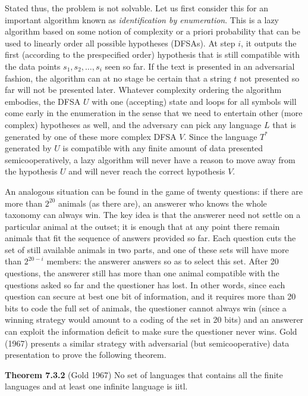 Stated thus, the problem is not solvable. Let us first consider this for an
important algorithm known as {\it identification by enumeration}. This is a
lazy algorithm based on some notion of complexity or a priori probability that
can be used to linearly order all possible hypotheses (DFSAs). At step $i$, it
outputs the first (according to the prespecified order) hypothesis that is
still compatible with the data points $s_1, s_2, \ldots, s_i$ seen so far. If
the text is presented in an adversarial fashion, the algorithm can at no stage
be certain that a string $t$ not presented so far will not be presented
later. Whatever complexity ordering the algorithm embodies, the DFSA $U$ with
one (accepting) state and loops for all symbols will come early in the
enumeration in the sense that we need to entertain other (more complex)
hypotheses as well, and the adversary can pick any language $L$ that is
generated by one of these more complex DFSA $V$. Since the language $T^*$
generated by $U$ is compatible with any finite amount of data presented
semicooperatively, a lazy algorithm will never have a reason to move away from
the hypothesis $U$ and will never reach the correct hypothesis $V$.

An analogous situation can be found in the game of twenty questions: if there
are more than $2^{20}$ animals (as there are), an answerer who knows the whole
taxonomy can always win. The key idea is that the answerer need not settle on
a particular animal at the outset; it is enough that at any point there remain
animals that fit the sequence of answers provided so far. Each question cuts
the set of still available animals in two parts, and one of these sets will
have more than $2^{20-i}$ members: the answerer answers so as to select this
set. After 20 questions, the answerer still has more than one animal
compatible with the questions asked so far and the questioner has lost. In
other words, since each question can secure at best one bit of information,
and it requires more than 20 bits to code the full set of animals, the
questioner cannot always win (since a winning strategy would amount to a coding
of the set in 20 bits) and an answerer can exploit the information deficit to
make sure the questioner never wins. Gold (1967) presents a similar strategy
with adversarial (but semicooperative) data presentation to prove the 
following theorem. 

\smallskip\noindent
{\bf Theorem 7.3.2} (Gold 1967) No set of languages that contains all the 
finite languages and at least one infinite language is iitl. 

